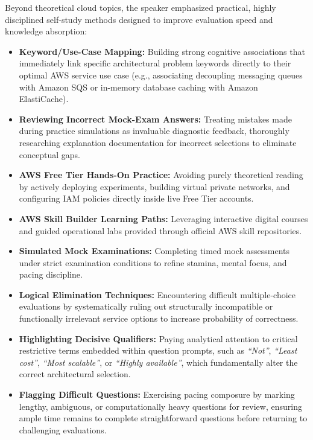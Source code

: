 Beyond theoretical cloud topics, the speaker emphasized practical,
highly disciplined self-study methods designed to improve evaluation
speed and knowledge absorption:

\begin{itemize}
\tightlist
\item
  \textbf{Keyword/Use-Case Mapping:} Building strong cognitive
  associations that immediately link specific architectural problem
  keywords directly to their optimal AWS service use case (e.g.,
  associating decoupling messaging queues with Amazon SQS or in-memory
  database caching with Amazon ElastiCache).
\item
  \textbf{Reviewing Incorrect Mock-Exam Answers:} Treating mistakes made
  during practice simulations as invaluable diagnostic feedback,
  thoroughly researching explanation documentation for incorrect
  selections to eliminate conceptual gaps.
\item
  \textbf{AWS Free Tier Hands-On Practice:} Avoiding purely theoretical
  reading by actively deploying experiments, building virtual private
  networks, and configuring IAM policies directly inside live Free Tier
  accounts.
\item
  \textbf{AWS Skill Builder Learning Paths:} Leveraging interactive
  digital courses and guided operational labs provided through official
  AWS skill repositories.
\item
  \textbf{Simulated Mock Examinations:} Completing timed mock
  assessments under strict examination conditions to refine stamina,
  mental focus, and pacing discipline.
\item
  \textbf{Logical Elimination Techniques:} Encountering difficult
  multiple-choice evaluations by systematically ruling out structurally
  incompatible or functionally irrelevant service options to increase
  probability of correctness.
\item
  \textbf{Highlighting Decisive Qualifiers:} Paying analytical attention
  to critical restrictive terms embedded within question prompts, such
  as \emph{``Not''}, \emph{``Least cost''}, \emph{``Most scalable''}, or
  \emph{``Highly available''}, which fundamentally alter the correct
  architectural selection.
\item
  \textbf{Flagging Difficult Questions:} Exercising pacing composure by
  marking lengthy, ambiguous, or computationally heavy questions for
  review, ensuring ample time remains to complete straightforward
  questions before returning to challenging evaluations.
\end{itemize}


